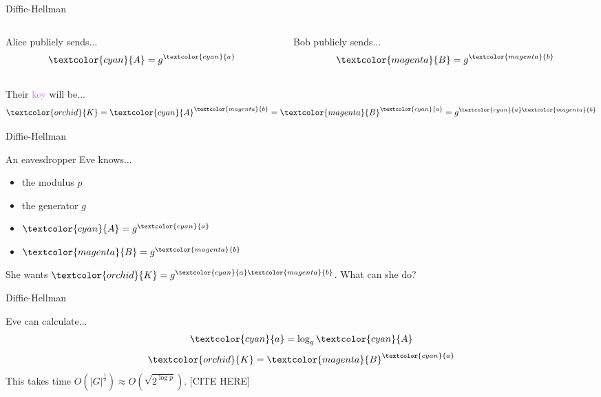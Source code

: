\documentclass[presentation, aspectratio=54]{beamer}
\newcommand{\cyan}[1]{\textcolor{cyan}{#1}}
\newcommand{\magenta}[1]{\textcolor{magenta}{#1}}
\newcommand{\purple}[1]{\textcolor{orchid}{#1}}
\begin{document}
\begin{frame}{Diffie-Hellman}

\begin{columns}
\begin{column}{0.5\textwidth}
Alice publicly sends...
\[\cyan{A} = g^{\cyan{a}}\]
\end{column}
\begin{column}{0.5\textwidth}
Bob publicly sends...
\[\magenta{B} = g^{\magenta{b}}\]
\end{column}
\end{columns}
\vspace{20pt}
Their \purple{key} will be...
\[\purple{K}
        = \cyan{A}^{\magenta{b}}
        = \magenta{B}^{\cyan{a}}
        = g^{\cyan{a}\magenta{b}}\]

\end{frame}


\begin{frame}{Diffie-Hellman}

An eavesdropper Eve knows...
\begin{itemize}
\item the modulus $p$
\item the generator $g$
\item $\cyan{A} = g^{\cyan{a}}$
\item $\magenta{B} = g^{\magenta{b}}$
\end{itemize}
She wants $\purple{K} = g^{\cyan{a}\magenta{b}}$. What can she do?

\end{frame}


\begin{frame}{Diffie-Hellman}

Eve can calculate...
\[\cyan{a} = \log_g \cyan{A}\]
\[\purple{K} = \magenta{B}^{\cyan{a}}\]
This takes time $O(|G|^{\frac{1}{2}}) \approx O(\sqrt{2^{\log p}})$. [CITE HERE]

\end{frame}
\end{document}
